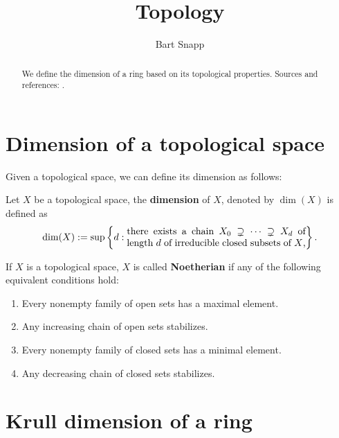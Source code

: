 \documentclass{ximera}
\author{Bart Snapp}
\title{Topology}
\begin{document}
\begin{abstract}
  We define the dimension of a ring based on its topological
  properties.  Sources and references: \cite{sD2008}.
\end{abstract}
\maketitle

\section{Dimension of a topological space}

Given a topological space, we can define its dimension as follows:


\begin{definition}
  Let $X$ be a topological space, the \textbf{dimension} of $X$,
  denoted by $\dim(X)$ is defined as
  \[
  \dim(X) :=\sup\left\{d:
  \begin{minipage}{43ex}
    there exists a chain $X_0\supsetneq \dots \supsetneq X_d$ of
    length $d$ of irreducible closed subsets of $X$,
  \end{minipage}
  \right\}.
  \]
\end{definition}


\begin{definition}
  If $X$ is a topological space, $X$ is called \textbf{Noetherian} if
  any of the following equivalent conditions hold:
  \begin{enumerate}
  \item Every nonempty family of open sets has a maximal element.
  \item Any increasing chain of open sets stabilizes.
  \item Every nonempty family of closed sets has a minimal element.
  \item Any decreasing chain of closed sets stabilizes.
  \end{enumerate}
\end{definition}




\section{Krull dimension of a ring}
\end{document}
